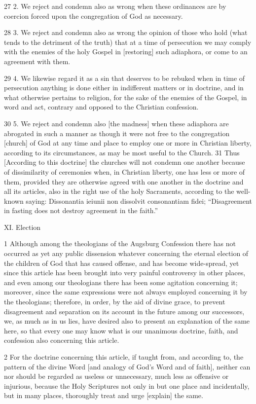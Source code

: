 {27 2. We reject and condemn also as wrong when these ordinances are by coercion forced upon the congregation of God as necessary.

28 3. We reject and condemn also as wrong the opinion of those who hold (what tends to the detriment of the truth) that at a time of persecution we may comply with the enemies of the holy Gospel in [restoring] such adiaphora, or come to an agreement with them.

29 4. We likewise regard it as a sin that deserves to be rebuked when in time of persecution anything is done either in indifferent matters or in doctrine, and in what otherwise pertains to religion, for the sake of the enemies of the Gospel, in word and act, contrary and opposed to the Christian confession.

30 5. We reject and condemn also [the madness] when these adiaphora are abrogated in such a manner as though it were not free to the congregation [church] of God at any time and place to employ one or more in Christian liberty, according to its circumstances, as may be most useful to the Church.
31 Thus [According to this doctrine] the churches will not condemn one another because of dissimilarity of ceremonies when, in Christian liberty, one has less or more of them, provided they are otherwise agreed with one another in the doctrine and all its articles, also in the right use of the holy Sacraments, according to the well-known saying: Dissonantia ieiunii non dissolvit consonantiam fidei; “Disagreement in fasting does not destroy agreement in the faith.”

XI. Election

1 Although among the theologians of the Augsburg Confession there has not occurred as yet any public dissension whatever concerning the eternal election of the children of God that has caused offense, and has become wide-spread, yet since this article has been brought into very painful controversy in other places, and even among our theologians there has been some agitation concerning it; moreover, since the same expressions were not always employed concerning it by the theologians; therefore, in order, by the aid of divine grace, to prevent disagreement and separation on its account in the future among our successors, we, as much as in us lies, have desired also to present an explanation of the same here, so that every one may know what is our unanimous doctrine, faith, and confession also concerning this article.

2 For the doctrine concerning this article, if taught from, and according to, the pattern of the divine Word [and analogy of God’s Word and of faith], neither can nor should be regarded as useless or unnecessary, much less as offensive or injurious, because the Holy Scriptures not only in but one place and incidentally, but in many places, thoroughly treat and urge [explain] the same.

}
